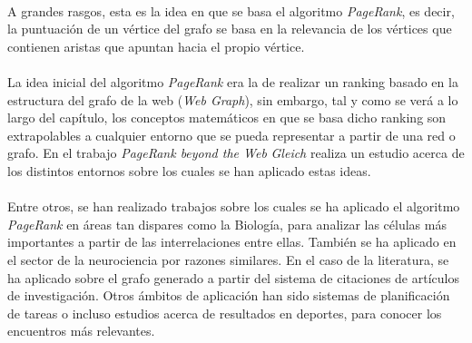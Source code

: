 \documentclass{subfiles}
\begin{document}
      \paragraph{}
      A grandes rasgos, esta es la idea en que se basa el algoritmo \emph{PageRank}, es decir, la puntuación de un vértice del grafo se basa en la relevancia de los vértices que contienen aristas que apuntan hacia el propio vértice.

      \paragraph{}
      La idea inicial del algoritmo \emph{PageRank} era la de realizar un ranking basado en la estructura del grafo de la web (\emph{Web Graph}), sin embargo, tal y como se verá a lo largo del capítulo, los conceptos matemáticos en que se basa dicho ranking son extrapolables a cualquier entorno que se pueda representar a partir de una red o grafo. En el trabajo \emph{PageRank beyond the Web}\cite{gleich2015pagerank} \emph{Gleich} realiza un estudio acerca de los distintos entornos sobre los cuales se han aplicado estas ideas.

      \paragraph{}
      Entre otros, se han realizado trabajos sobre los cuales se ha aplicado el algoritmo \emph{PageRank} en áreas tan dispares como la Biología, para analizar las células más importantes a partir de las interrelaciones entre ellas. También se ha aplicado en el sector de la neurociencia por razones similares. En el caso de la literatura, se ha aplicado sobre el grafo generado a partir del sistema de citaciones de artículos de investigación. Otros ámbitos de aplicación han sido sistemas de planificación de tareas o incluso estudios acerca de resultados en deportes, para conocer los encuentros más relevantes.
\end{document}
